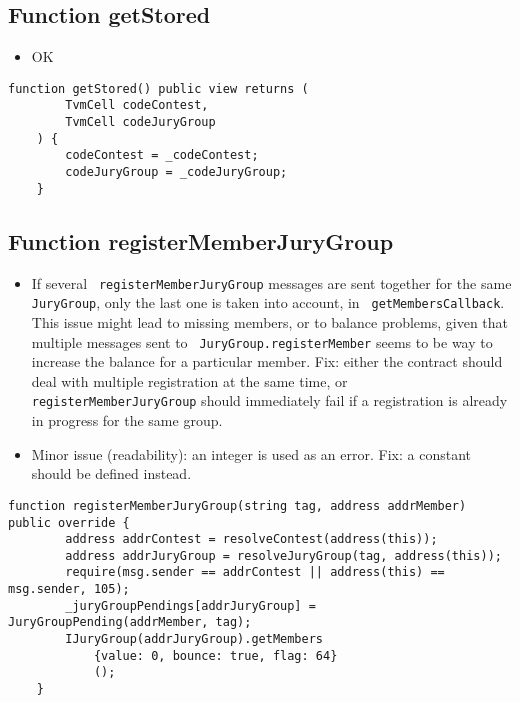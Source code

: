 \subsection{Function getStored}

\begin{itemize}
\item OK
\end{itemize}

\begin{lstlisting}[firstnumber=142]
    function getStored() public view returns (
        TvmCell codeContest,
        TvmCell codeJuryGroup
    ) {
        codeContest = _codeContest;
        codeJuryGroup = _codeJuryGroup;
    }
\end{lstlisting}

\subsection{Function registerMemberJuryGroup}

\begin{itemize}
\item {} {If several {\tt
    registerMemberJuryGroup} messages are sent together for the same
  {\tt JuryGroup}, only the last one is taken into account, in {\tt
    getMembersCallback}. This issue might lead to missing members, or
  to balance problems, given that multiple messages sent to {\tt
    JuryGroup.registerMember} seems to be way to increase the balance
  for a particular member. Fix: either the contract should deal with
  multiple registration at the same time, or {\tt
    registerMemberJuryGroup} should immediately fail if a registration
  is already in progress for the same group.  }
\item Minor issue (readability): an integer is used as an error. Fix:
  a constant should be defined instead.
\end{itemize}

\begin{lstlisting}[firstnumber=120]
    function registerMemberJuryGroup(string tag, address addrMember) public override {
        address addrContest = resolveContest(address(this));
        address addrJuryGroup = resolveJuryGroup(tag, address(this));
        require(msg.sender == addrContest || address(this) == msg.sender, 105);
        _juryGroupPendings[addrJuryGroup] = JuryGroupPending(addrMember, tag);
        IJuryGroup(addrJuryGroup).getMembers
            {value: 0, bounce: true, flag: 64}
            ();
    }
\end{lstlisting}


